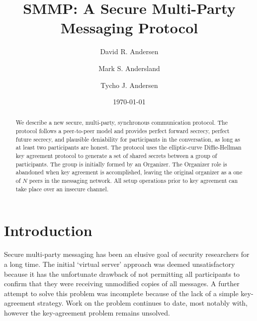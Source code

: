 \documentclass[%
preprint,
amsmath,amssymb,
aps,
prb,
floatfix,
]{revtex4-1}
\begin{document}

\title{SMMP: A Secure Multi-Party Messaging Protocol}%

\author{David R. Andersen}
\author{Mark S. Andersland}
\author{Tycho J. Andersen}

\date{\today}%

\begin{abstract}
We describe a new secure, multi-party, synchronous communication protocol.
The protocol follows a peer-to-peer model and provides perfect forward
secrecy, perfect future secrecy, and plausible deniability for participants in
the conversation, as long as at least two participants are honest.
The protocol uses the elliptic-curve Diffie-Hellman key agreement
protocol to generate a set of shared secrets between a group of
participants. The group is initially formed by an Organizer.
The Organizer role is abandoned when key agreement is accomplished, leaving
the original organizer as a one of $N$ peers in the messaging network.
All setup operations prior to key agreement can take place over an insecure
channel.
\end{abstract}

\maketitle

\section{\label{sec:Introduction}Introduction}
Secure multi-party messaging has been an elusive goal of security researchers
for a long time. The initial `virtual server' approach\cite{ref:bian}
was deemed unsatisfactory
because it has the unfortunate drawback of not permitting all participants to
confirm that they were receiving unmodified copies of all messages.
A further attempt to solve this problem\cite{ref:goldberg} was incomplete
because of the lack of a simple key-agreement strategy. Work on the problem
continues to date, most notably with\cite{ref:cryptocat}, however the
key-agreement problem remains unsolved.
\end{document}
